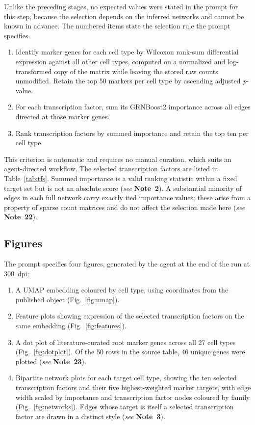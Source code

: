 \documentclass[11pt,a4paper]{article}
\newcommand{\seenote}[1]{(\textit{see} \textbf{Note~#1})}
\begin{document}
Unlike the preceding stages, no expected values were stated in the prompt for this step, because the selection depends on the inferred networks and cannot be known in advance. The numbered items state the selection rule the prompt specifies.

\begin{enumerate}[leftmargin=*]
\item Identify marker genes for each cell type by Wilcoxon rank-sum differential expression \cite{wolf2018} against all other cell types, computed on a normalized and log-transformed copy of the matrix while leaving the stored raw counts unmodified. Retain the top 50 markers per cell type by ascending adjusted \textit{p}-value.

\item For each transcription factor, sum its GRNBoost2 importance across all edges directed at those marker genes.

\item Rank transcription factors by summed importance and retain the top ten per cell type.
\end{enumerate}

This criterion is automatic and requires no manual curation, which suits an agent-directed workflow. The selected transcription factors are listed in Table~\ref{tab:tfs}. Summed importance is a valid ranking statistic within a fixed target set but is not an absolute score \seenote{2}. A substantial minority of edges in each full network carry exactly tied importance values; these arise from a property of sparse count matrices and do not affect the selection made here \seenote{22}.

\subsection{Figures}

The prompt specifies four figures, generated by the agent at the end of the run at 300~dpi:

\begin{enumerate}[leftmargin=*]
\item A UMAP embedding coloured by cell type, using coordinates from the published object (Fig.~\ref{fig:umap}).
\item Feature plots showing expression of the selected transcription factors on the same embedding (Fig.~\ref{fig:features}).
\item A dot plot of literature-curated root marker genes across all 27 cell types (Fig.~\ref{fig:dotplot}). Of the 50 rows in the source table, 46 unique genes were plotted \seenote{23}.
\item Bipartite network plots for each target cell type, showing the ten selected transcription factors and their five highest-weighted marker targets, with edge width scaled by importance and transcription factor nodes coloured by family (Fig.~\ref{fig:networks}). Edges whose target is itself a selected transcription factor are drawn in a distinct style \seenote{3}.
\end{enumerate}
\end{document}
